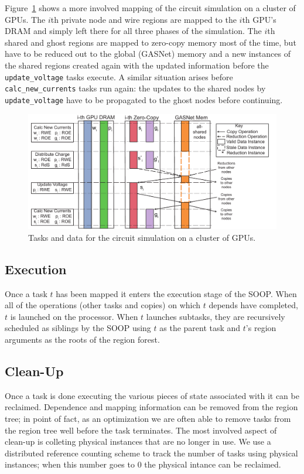 %

Figure~\ref{fig:gpumapping} shows a more involved mapping of the circuit simulation
on a cluster of GPUs.  The $i$th private node and wire regions are mapped to the
$i$th GPU's DRAM and simply left there for all three phases of the simulation.  The $i$th
shared and ghost regions are mapped to zero-copy memory most of the time, but have to be
reduced out to the global (GASNet) memory and a new instances of the  shared  regions
created again with the updated information before the {\tt update\_voltage} tasks execute.
A similar situation arises before {\tt calc\_new\_currents} tasks run again: the updates
to the shared nodes by {\tt update\_voltage} have to be propagated to the ghost nodes before
continuing.

\begin{figure}
\includegraphics[scale=0.48]{figs/CircuitMem.pdf}
\caption{Tasks and data for the circuit simulation on a cluster of GPUs.}
\label{fig:gpumapping}
\end{figure}

\subsection{Execution}
\label{sec:exec}

Once a task $t$ has been mapped it enters the execution stage of the SOOP.  When all of
the operations (other tasks and copies) on which $t$ depends have completed, $t$ is
launched on the processor.  When $t$ launches subtasks, they are recursively scheduled as siblings by
the SOOP using $t$ as the parent task and $t$'s region arguments as the roots of the region forest.


\subsection{Clean-Up}
\label{sec:clean}

Once a task is done executing the various pieces of state associated with it can be reclaimed.
Dependence and mapping information can be removed from the region tree; in point of fact, 
as an optimization we are often able to remove tasks from the region tree well before the task terminates.
The most involved aspect of clean-up is colleting physical instances that are no longer in use.
We use a distributed reference counting scheme to track the number of tasks using physical instances;
when this number goes to 0 the physical intance can be reclaimed.


